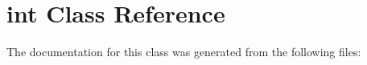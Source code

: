 \hypertarget{classint}{}\section{int Class Reference}
\label{classint}


The documentation for this class was generated from the following files\+: